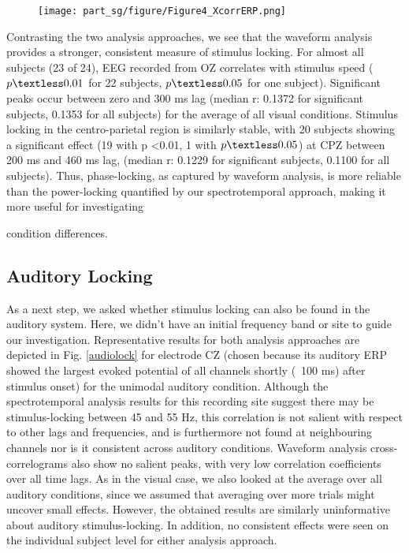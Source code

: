 \begin{figure}[!htb]\centerline{
\texttt{[image: part\_sg/figure/Figure4\_XcorrERP.png]}}
\caption[EEG Waveforms Lock to Visual Input at Multiple Sites.]
{\protect}\label{waveform} \end{figure} 



Contrasting the two analysis approaches, we see that the waveform analysis
provides a stronger, consistent measure of stimulus locking. For almost all
subjects (23 of 24), EEG recorded from OZ correlates with stimulus speed
($p \textless 0.01$ for 22 subjects, $p \textless 0.05$ for one subject).
Significant peaks occur between zero and 300 ms lag (median r: 0.1372 for
significant subjects, 0.1353 for all subjects) for the average of all
visual conditions. Stimulus locking in the centro-parietal region is
similarly stable, with 20 subjects showing a significant effect (19 with p
\textless 0.01, 1 with $p \textless 0.05$) at CPZ between 200 ms and 460 ms
lag, (median r: 0.1229 for significant subjects, 0.1100 for all subjects).
Thus, phase-locking, as captured by waveform analysis, is more reliable
than the power-locking quantified by our spectrotemporal approach, making
it more useful for investigating \linebreak 

condition differences.



\subsection{Auditory Locking}

As a next step, we asked whether stimulus locking can also be found in the
auditory system. Here, we didn't have an initial frequency band or site to
guide our investigation. Representative results for both analysis
approaches are depicted in Fig. \ref{audiolock} for electrode CZ (chosen because its
auditory ERP showed the largest evoked potential of all channels shortly
(~100 ms) after stimulus onset) for the unimodal auditory condition.
Although the spectrotemporal analysis results for this recording site
suggest there may be stimulus-locking between 45 and 55 Hz, this
correlation is not salient with respect to other lags and frequencies, and
is furthermore not found at neighbouring channels nor is it consistent
across auditory conditions. Waveform analysis cross-correlograms also show
no salient peaks, with very low correlation coefficients over all time
lags. As in the visual case, we also looked at the average over all
auditory conditions, since we assumed that averaging over more trials might
uncover small effects. However, the obtained results are similarly
uninformative about auditory stimulus-locking. In addition, no consistent
effects were seen on the individual subject level for either analysis
approach.


